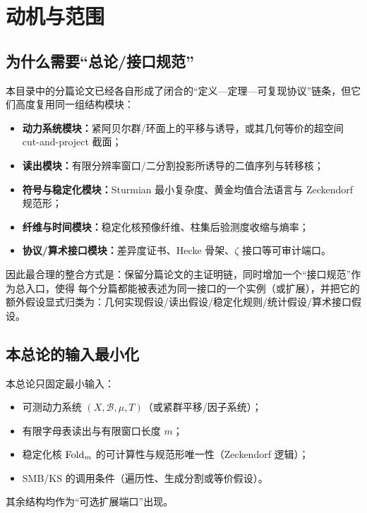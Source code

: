\section{动机与范围}

\subsection{为什么需要“总论/接口规范”}

本目录中的分篇论文已经各自形成了闭合的“定义—定理—可复现协议”链条，但它们高度复用同一组结构模块：
\begin{itemize}
  \item \textbf{动力系统模块：}紧阿贝尔群/环面上的平移与诱导，或其几何等价的超空间 cut-and-project 截面；
  \item \textbf{读出模块：}有限分辨率窗口/二分割投影所诱导的二值序列与转移核；
  \item \textbf{符号与稳定化模块：}Sturmian 最小复杂度、黄金均值合法语言与 Zeckendorf 规范形；
  \item \textbf{纤维与时间模块：}稳定化核预像纤维、柱集后验测度收缩与熵率；
  \item \textbf{协议/算术接口模块：}差异度证书、Hecke 骨架、$\zeta$ 接口等可审计端口。
\end{itemize}

因此最合理的整合方式是：保留分篇论文的主证明链，同时增加一个“接口规范”作为总入口，使得
每个分篇都能被表述为同一接口的一个实例（或扩展），并把它的额外假设显式归类为：几何实现假设/读出假设/稳定化规则/统计假设/算术接口假设。

\subsection{本总论的输入最小化}

本总论只固定最小输入：
\begin{itemize}
  \item 可测动力系统 $(X,\mathcal{B},\mu,T)$（或紧群平移/因子系统）；
  \item 有限字母表读出与有限窗口长度 $m$；
  \item 稳定化核 $\mathrm{Fold}_m$ 的可计算性与规范形唯一性（Zeckendorf 逻辑）；
  \item SMB/KS 的调用条件（遍历性、生成分割或等价假设）。
\end{itemize}
其余结构均作为“可选扩展端口”出现。

